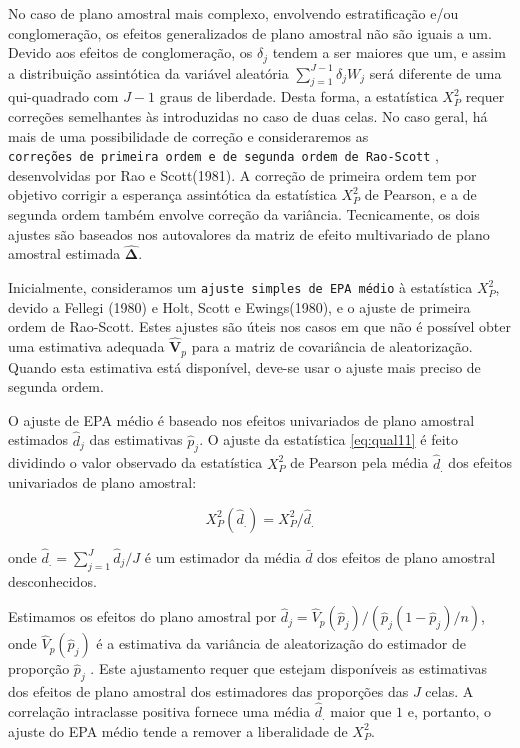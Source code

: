 \documentclass[]{book}
\numberwithin{example}{chapter}
\numberwithin{remark}{chapter}
\numberwithin{definition}{chapter}
\begin{document}
No caso de plano amostral mais complexo, envolvendo estratificação e/ou
conglomeração, os efeitos generalizados de plano amostral não são iguais
a um. Devido aos efeitos de conglomeração, os \(\delta _{j}\) tendem a
ser maiores que um, e assim a distribuição assintótica da variável
aleatória \(\sum_{j=1}^{J-1}\delta_{j}W_{j}\) será diferente de uma
qui-quadrado com \(J-1\) graus de liberdade. Desta forma, a estatística
\(X_{P}^{2}\) requer correções semelhantes às introduzidas no caso de
duas celas. No caso geral, há mais de uma possibilidade de correção e
consideraremos as
\texttt{correções\ de\ primeira\ ordem\ e\ de\ segunda\ ordem\ de\ Rao-Scott}
, desenvolvidas por Rao e Scott(1981). A correção de primeira ordem tem
por objetivo corrigir a esperança assintótica da estatística
\(X_{P}^{2}\) de Pearson, e a de segunda ordem também envolve correção
da variância. Tecnicamente, os dois ajustes são baseados nos autovalores
da matriz de efeito multivariado de plano amostral estimada
\(\widehat{\mathbf{\Delta }}\).

Inicialmente, consideramos um \texttt{ajuste\ simples\ de\ EPA\ médio} à
estatística \(X_{P}^{2}\), devido a Fellegi (1980) e Holt, Scott e
Ewings(1980), e o ajuste de primeira ordem de Rao-Scott. Estes ajustes
são úteis nos casos em que não é possível obter uma estimativa adequada
\(\mathbf{\hat{V}}_{p}\) para a matriz de covariância de aleatorização.
Quando esta estimativa está disponível, deve-se usar o ajuste mais
preciso de segunda ordem.

O ajuste de EPA médio é baseado nos efeitos univariados de plano
amostral estimados \(\hat{d}_{j}\) das estimativas \(\hat{p}_{j}\). O
ajuste da estatística \eqref{eq:qual11} é feito dividindo o valor
observado da estatística \(X_{P}^{2}\) de Pearson pela média
\(\hat{d}_{.}\) dos efeitos univariados de plano amostral:

\begin{equation}
X_{P}^{2}\left( \hat{d}_{.}\right) =X_{P}^{2}/\hat{d}_{.}  
\label{eq:qual12}
\end{equation}

onde \(\hat{d}_{.}=\sum_{j=1}^{J}\hat{d}_{j}/J\) é um estimador da média
\(\bar{d}\) dos efeitos de plano amostral desconhecidos.

Estimamos os efeitos do plano amostral por
\(\hat{d}_{j}=\hat{V}_{p}\left(\hat{p}_{j}\right) /\left( \hat{p}_{j}\left( 1-\hat{p}_{j}\right) /n\right)\),
onde \(\hat{V}_{p}\left( \hat{p}_{j}\right)\) é a estimativa da
variância de aleatorização do estimador de proporção \(\hat{p}_{j}\) .
Este ajustamento requer que estejam disponíveis as estimativas dos
efeitos de plano amostral dos estimadores das proporções das \(J\)
celas. A correlação intraclasse positiva fornece uma média
\(\hat{d}_{.}\) maior que \(1\) e, portanto, o ajuste do EPA médio tende
a remover a liberalidade de \(X_{P}^{2}\).
\end{document}
